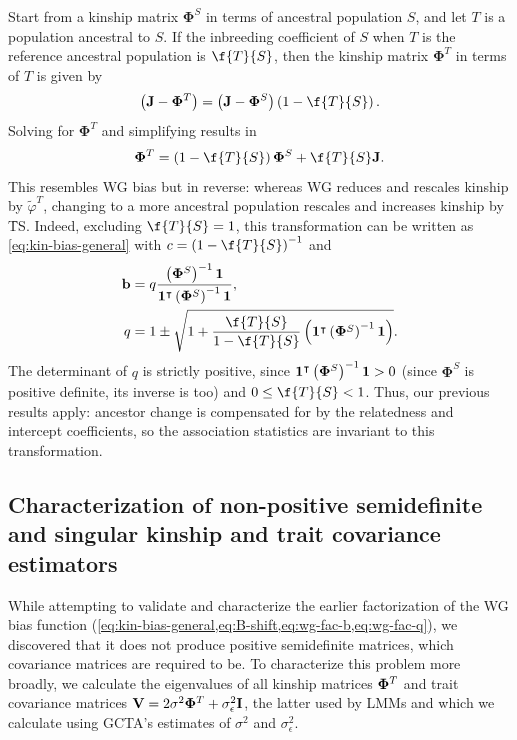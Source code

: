 \documentclass[11pt]{article}
\newcommand{\kinMat}[1][T]{%
  \ensuremath{%
    \mathbf{\Phi}^{#1}
  }%
  \xspace%
}%
\begin{document}
Start from a kinship matrix \kinMat[S] in terms of ancestral population $S$, and let $T$ is a population ancestral to $S$.
If the inbreeding coefficient of $S$ when $T$ is the reference ancestral population is $\f{T}{S}$, then the kinship matrix \kinMat in terms of $T$ is given by \citep{ochoa_estimating_2021}
$$
\left( \mathbf{J} - \kinMat \right)
=
\left( \mathbf{J} - \kinMat[S] \right) \left( 1 - \f{T}{S} \right)
.
$$
Solving for \kinMat and simplifying results in
$$
\kinMat
=
\left( 1 - \f{T}{S} \right) \kinMat[S] + \f{T}{S} \mathbf{J}
.
$$
This resembles WG bias but in reverse: whereas WG reduces and rescales kinship by $\tilde{\varphi}^T$, changing to a more ancestral population rescales and increases kinship by \f{T}{S}.
Indeed, excluding $\f{T}{S} = 1$, this transformation can be written as \cref{eq:kin-bias-general} with
$c = \left( 1 - \f{T}{S} \right)^{-1}$ and
\begin{align*}
  \mathbf{b}
  &=
    q \frac{ \left( \kinMat[S] \right)^{-1} \mathbf{1} }{ \mathbf{1}^\intercal \left( \kinMat[S] \right)^{-1} \mathbf{1} }
  , \\
  q
  &=
    1 \pm \sqrt{1 + \frac{ \f{T}{S} }{ 1 - \f{T}{S} } \left( \mathbf{1}^\intercal \left( \kinMat[S] \right)^{-1} \mathbf{1} \right) }
.
\end{align*}
The determinant of $q$ is strictly positive, since $\mathbf{1}^\intercal \left( \kinMat[S] \right)^{-1} \mathbf{1} > 0$ (since \kinMat[S] is positive definite, its inverse is too) and $0 \le \f{T}{S} < 1$.
Thus, our previous results apply: ancestor change is compensated for by the relatedness and intercept coefficients, so the association statistics are invariant to this transformation.

\subsection{Characterization of non-positive semidefinite and singular kinship and trait covariance estimators}

While attempting to validate and characterize the earlier factorization of the WG bias function (\cref{eq:kin-bias-general,eq:B-shift,eq:wg-fac-b,eq:wg-fac-q}), we discovered that it does not produce positive semidefinite matrices, which covariance matrices are required to be.
To characterize this problem more broadly, we calculate the eigenvalues of all kinship matrices $\kinMat$ and trait covariance matrices $\mathbf{V} = 2 \sigma^2 \kinMat + \sigma^2_\epsilon \mathbf{I}$, the latter used by LMMs and which we calculate using GCTA's estimates of $\sigma^2$ and $\sigma^2_\epsilon$.
\end{document}
